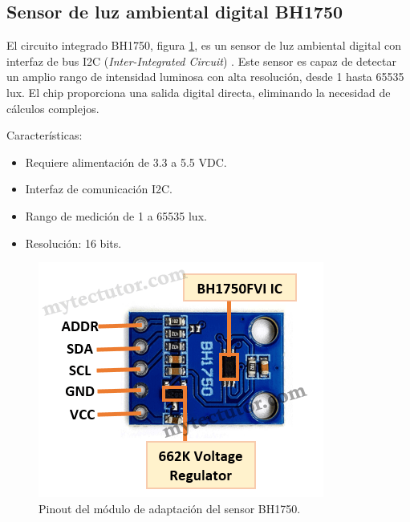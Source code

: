


\subsection{Sensor de luz ambiental digital BH1750}

El circuito integrado BH1750, figura \ref{fig:BH1750}, es un sensor de luz ambiental digital con interfaz de bus I2C (\textit{Inter-Integrated Circuit}) \cite{BH1750}. Este sensor es capaz de detectar un amplio rango de intensidad luminosa con alta resolución, desde 1 hasta 65535 lux. El chip proporciona una salida digital directa, eliminando la necesidad de cálculos complejos.

Características:

\begin{itemize}
	\item Requiere alimentación de 3.3 a 5.5 VDC.
	\item Interfaz de comunicación I2C.
	\item Rango de medición de 1 a 65535 lux.
	\item Resolución: 16 bits.
\end{itemize}

\begin{figure}[h]
\centering
\includegraphics[scale=.5]{./Figures/BH1750.png}
	\caption{Pinout del módulo de adaptación del sensor BH1750\protect\footnotemark.}
	\label{fig:BH1750}
\end{figure}

